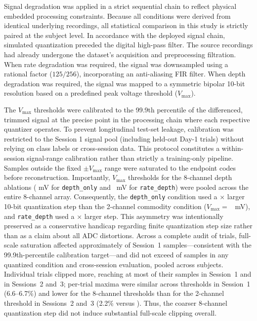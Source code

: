\documentclass[preprint,12pt]{elsarticle}
\newcommand{\Vmax}{V_{\mathrm{max}}}
\begin{document}
Signal degradation was applied in a strict sequential chain to reflect physical embedded processing constraints. Because all conditions were derived from identical underlying recordings, all statistical comparison in this study is strictly paired at the subject level. In accordance with the deployed signal chain, simulated quantization preceded the digital high-pass filter. The source recordings had already undergone the dataset's acquisition and preprocessing filtration. When rate degradation was required, the signal was downsampled using a rational factor ($125/256$), incorporating an anti-aliasing FIR filter. When depth degradation was required, the signal was mapped to a symmetric bipolar 10-bit resolution based on a predefined peak voltage threshold ($\Vmax$).

The $\Vmax$ thresholds were calibrated to the 99.9th percentile of the differenced, trimmed signal at the precise point in the processing chain where each respective quantizer operates. To prevent longitudinal test-set leakage, calibration was restricted to the Session 1 signal pool (including held-out Day-1 trials) without relying on class labels or cross-session data. This protocol constitutes a within-session signal-range calibration rather than strictly a training-only pipeline. Samples outside the fixed $\pm \Vmax$ range were saturated to the endpoint codes before reconstruction. Importantly, $\Vmax$ thresholds for the 8-channel depth ablations (\vmaxEightCh{} mV for \texttt{depth\_only} and \vmaxEightChResampled{}~mV for \texttt{rate\_depth}) were pooled across the entire 8-channel array. Consequently, the \texttt{depth\_only} condition used a \depthCommodityStepRatio{}$\times$ larger 10-bit quantization step than the 2-channel commodity condition ($\Vmax = $ \vmaxTwoCh{}~mV), and \texttt{rate\_depth} used a \rateDepthCommodityStepRatio{}$\times$ larger step. This asymmetry was intentionally preserved as a conservative handicap regarding finite quantization step size rather than as a claim about all ADC distortions. Across a complete audit of \quantAuditTrials{} trials, full-scale saturation affected approximately \quantSatSessionOneApprox{} of Session~1 samples---consistent with the 99.9th-percentile calibration target---and did not exceed \quantSatCrossSessionMax{} of samples in any quantized condition and cross-session evaluation, pooled across subjects. Individual trials clipped more, reaching at most \quantSatTrialMaxSessionOne{} of their samples in Session~1 and \quantSatTrialMaxCross{} in Sessions~2 and~3; per-trial maxima were similar across thresholds in Session~1 (6.6--6.7\%) and lower for the 8-channel thresholds than for the 2-channel threshold in Sessions~2 and~3 (2.2\% versus \quantSatTrialMaxCross{}). Thus, the coarser 8-channel quantization step did not induce substantial full-scale clipping overall.
\end{document}
